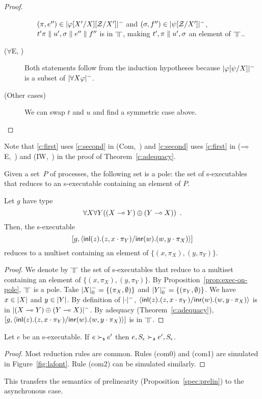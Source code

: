 \begin{proof}
\begin{description}
\begin{enumerate}[label=\textit{(\arabic{*})}]
	      $(\pi,e'')\in|{\varphi[X'/X][\mathcal Z/X']}|^-$ and
	      $(\sigma,f'')\in|{\psi[\mathcal Z/X']}|^-$,
	      $t'\pi\parallel u',\sigma\parallel e''\parallel f''$ is in $\bbot$,
	      making $t',\pi\parallel u',\sigma$ an element of
	      $\bbot$..
       \end{enumerate}
  \item[($\forall$E, \textminus)]
       Both statements follow from the induction hypotheses
       because $|{\varphi[\psi/X]}|^-$ is a subset of $|{\forall
       X\varphi}|^-$.
   \item[(Other cases)]
	We can swap $t$ and $u$ and find a symmetric case above.
 \end{description}
 \end{proof}
Note that \ref{c:first} uses \ref{c:second} in (Com,~\textminus)
and \ref{c:second} uses \ref{c:first} in ($\multimap$E,~\textminus) and
(IW,~\textminus) in the proof of Theorem~\ref{c:adequacy}.

\begin{proposition}
 \label{prop:exec-on-pole}
 Given a set~$P$ of processes,
 the following set is a pole: the set of s-executables that reduces to
 an s-executable containing an element of $P$.
\end{proposition}

\begin{proposition}
 \label{spec:prelin}
 Let $g$ have type \[
{\forall X\forall
 Y((X\multimap Y)\oplus (Y\multimap X))}\enspace.
		   \]
 Then, the s-executable
 \[
 [g, \langle \mathsf{inl}({z}). ({z},{x\cdot\pi_Y})/ \mathsf{inr}({w}). ({w},{y\cdot\pi_X})\rangle]
 \]
 reduces to a multiset containing an element of
 $\{(x,\pi_X), (y,\pi_Y)\}$.
\end{proposition}
\begin{proof}
 We denote by $\bbot$ the set of s-executables that reduce to a multiset
 containing an element of $\{(x,\pi_X), (y,\pi_Y)\}$.
 By Proposition~\ref{prop:exec-on-pole}, $\bbot$ is a pole.
 Take $|{X}|^-_0 = \{(\pi_X,\emptyset)\}$ and
      $|{Y}|^-_0 = \{(\pi_Y,\emptyset)\}$.
 We have $x\in|{X}|$ and $y\in|{Y}|$.
 By definition of $|{\cdot}|^-$,
 $\langle \mathsf{inl}({z}). ({z},{x\cdot\pi_Y})/ \mathsf{inr}({w}). ({w},{y\cdot\pi_X})\rangle$ is in $|{(X\multimap
 Y)\oplus (Y\multimap X)}|^-$\kern -1.5pt.
 By adequacy (Theorem~\ref{c:adequacy}), $\left[g,
 \langle \mathsf{inl}({z}). ({z},{x\cdot\pi_Y})/ \mathsf{inr}({w}). ({w},{y\cdot\pi_X})\rangle\right]$ is in $\bbot$.
\end{proof}

\begin{proposition}
 \label{simu}
 Let $e$ be an s-executable.
 If $e\succ_{\mathsf s} e'$ then $e, S_\epsilon \succ_{\mathsf a} e', S_\epsilon$.
\end{proposition}
\begin{proof}
 Most reduction rules are common.  Rules (com0) and (com1) are
 simulated in Figure~\ref{fig:lafont}.  Rule (com2) can be simulated similarly.
\end{proof}
This transfers the semantics of prelinearity
(Proposition~\ref{spec:prelin}) to the asynchronous case.

